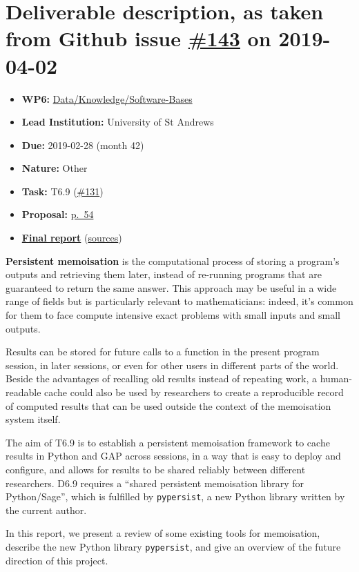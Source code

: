 \section*{\texorpdfstring{Deliverable description, as taken from Github
issue
\href{https://github.com/OpenDreamKit/OpenDreamKit/issues/143}{\#143} on
2019-04-02}{Deliverable description, as taken from Github issue \#143 on 2019-04-02}}\label{deliverable-description-as-taken-from-github-issue-143-on-2019-04-02}

\begin{itemize}
\tightlist
\item
  \textbf{WP6:}
  \href{https://github.com/OpenDreamKit/OpenDreamKit/tree/master/WP6}{Data/Knowledge/Software-Bases}
\item
  \textbf{Lead Institution:} University of St Andrews
\item
  \textbf{Due:} 2019-02-28 (month 42)
\item
  \textbf{Nature:} Other
\item
  \textbf{Task:} T6.9
  (\href{https://github.com/OpenDreamKit/OpenDreamKit/issues/131}{\#131})
\item
  \textbf{Proposal:}
  \href{https://github.com/OpenDreamKit/OpenDreamKit/raw/master/Proposal/proposal-www.pdf}{p.~54}
\item
  \textbf{\href{https://github.com/OpenDreamKit/OpenDreamKit/raw/master/WP6/D6.9/report-final.pdf}{Final
  report}}
  (\href{https://github.com/OpenDreamKit/OpenDreamKit/raw/master/WP6/D6.9/}{sources})
\end{itemize}

\textbf{Persistent memoisation} is the computational process of storing
a program's outputs and retrieving them later, instead of re-running
programs that are guaranteed to return the same answer. This approach
may be useful in a wide range of fields but is particularly relevant to
mathematicians: indeed, it's common for them to face compute intensive
exact problems with small inputs and small outputs.

Results can be stored for future calls to a function in the present
program session, in later sessions, or even for other users in different
parts of the world. Beside the advantages of recalling old results
instead of repeating work, a human-readable cache could also be used by
researchers to create a reproducible record of computed results that can
be used outside the context of the memoisation system itself.

The aim of T6.9 is to establish a persistent memoisation framework to
cache results in Python and GAP across sessions, in a way that is easy
to deploy and configure, and allows for results to be shared reliably
between different researchers. D6.9 requires a ``shared persistent
memoisation library for Python/Sage'', which is fulfilled by
\texttt{pypersist}, a new Python library written by the current author.

In this report, we present a review of some existing tools for
memoisation, describe the new Python library \texttt{pypersist}, and
give an overview of the future direction of this project.

